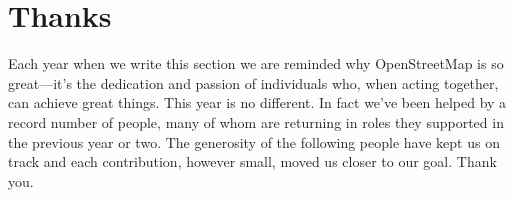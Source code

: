 \newpage
\section*{Thanks}
\label{thanks}
\pagestyle{cropmarksstyle}

Each year when we write this section we are reminded why OpenStreetMap is so great---it's the dedication
and passion of individuals who, when acting together, can achieve great things. This year is no
different. In fact we've been helped by a record number of people, many of whom are returning in
roles they supported in the previous year or two. The generosity of the following people have kept
us on track and each contribution, however small, moved us closer to our goal. Thank you.

